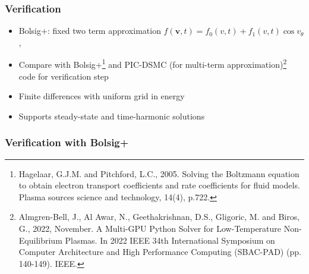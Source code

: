\documentclass[mathserif, aspectratio=169]{beamer}
\newcommand{\vect}[1]{\boldsymbol{#1}}
\begin{document}
\begin{frame}
	\frametitle{Verification}
	\begin{itemize}
		\item Bolsig+: fixed two term approximation $f(\vect{v},t) = f_0(v, t) + f_1(v,t)\cos v_\theta$, %
		\item Compare with Bolsig+\footnote[frame]{Hagelaar, G.J.M. and Pitchford, L.C., 2005. Solving the Boltzmann equation to obtain electron transport coefficients and rate coefficients for fluid models. Plasma sources science and technology, 14(4), p.722.} and PIC-DSMC (for multi-term approximation)\footnote[frame]{Almgren-Bell, J., Al Awar, N., Geethakrishnan, D.S., Gligoric, M. and Biros, G., 2022, November. A Multi-GPU Python Solver for Low-Temperature Non-Equilibrium Plasmas. In 2022 IEEE 34th International Symposium on Computer Architecture and High Performance Computing (SBAC-PAD) (pp. 140-149). IEEE.} code for verification step 
		\item Finite differences with uniform grid in energy
		\item Supports steady-state and time-harmonic solutions
	\end{itemize}
\end{frame}

\begin{frame}[fragile]
	\frametitle{Verification with Bolsig+}	
	\begin{center}
	\end{center}
\end{frame}
\end{document}

